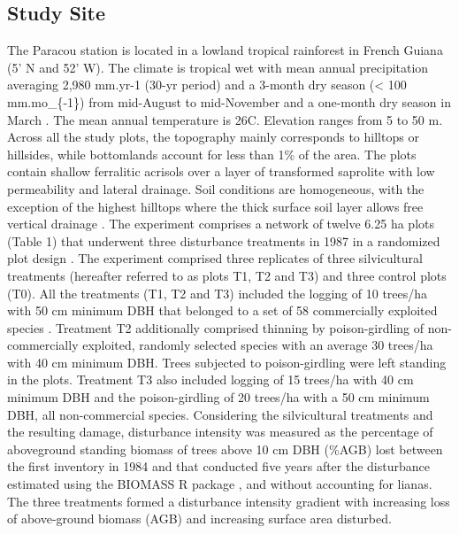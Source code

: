 \documentclass[fleqn,10pt]{ArtEcoFoG} %
\begin{document}
\hypertarget{study-site}{%
\subsection{Study Site}\label{study-site}}

The Paracou station is located in a lowland tropical rainforest in French Guiana (5' N and 52' W). The climate is tropical wet with mean annual precipitation averaging 2,980 mm.yr-1 (30-yr period) and a 3-month dry season (\textless{} 100 mm.mo\_\{-1\}) from mid-August to mid-November and a one-month dry season in March \citep{Wagner2011}.
The mean annual temperature is 26\textdegree C. Elevation ranges from 5 to 50 m. Across all the study plots, the topography mainly corresponds to hilltops or hillsides, while bottomlands account for less than 1\% of the area. The plots contain shallow ferralitic acrisols over a layer of transformed saprolite with low permeability and lateral drainage. Soil conditions are homogeneous, with the exception of the highest hilltops where the thick surface soil layer allows free vertical drainage \citep{Gourlet-Fleury2004}.
The experiment comprises a network of twelve 6.25 ha plots (Table 1) that underwent three disturbance treatments in 1987 in a randomized plot design \citep{Herault2018}.
The experiment comprised three replicates of three silvicultural treatments (hereafter referred to as plots T1, T2 and T3) and three control plots (T0). All the treatments (T1, T2 and T3) included the logging of 10 trees/ha with 50 cm minimum DBH that belonged to a set of 58 commercially exploited species \citep{Gourlet-Fleury2004}.
Treatment T2 additionally comprised thinning by poison-girdling of non-commercially exploited, randomly selected species with an average 30 trees/ha with 40 cm minimum DBH. Trees subjected to poison-girdling were left standing in the plots. Treatment T3 also included logging of 15 trees/ha with 40 cm minimum DBH and the poison-girdling of 20 trees/ha with a 50 cm minimum DBH, all non-commercial species. Considering the silvicultural treatments and the resulting damage, disturbance intensity was measured as the percentage of aboveground standing biomass of trees above 10 cm DBH (\%AGB) lost between the first inventory in 1984 and that conducted five years after the disturbance \citep{Piponiot2016} estimated using the BIOMASS R package \citep{Rejou2017, Biomass2018}, and without accounting for lianas. The three treatments formed a disturbance intensity gradient with increasing loss of above-ground biomass (AGB) and increasing surface area disturbed.
\end{document}
